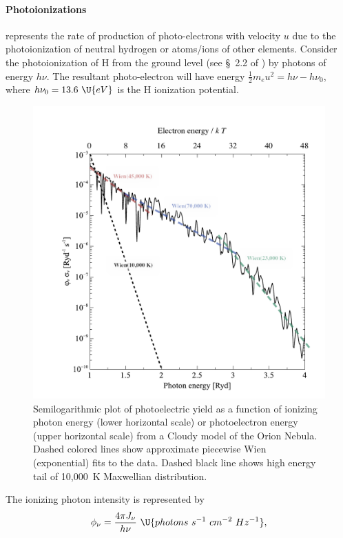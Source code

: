 \documentclass{emulateapj}
\begin{document}
\paragraph{Photoionizations}  represents the rate of
production of photo-electrons with velocity \(u\) due to the
photoionization of neutral hydrogen or atoms/ions of other elements.
Consider the photoionization of H from the ground level (see \S~2.2 of
\citealp{2006agna.book.....O}) by photons of energy \(h\nu\).
The resultant photo-electron will have energy \(\frac12 m_e u^2 = h\nu
- h\nu_0\), where \(h\nu_0 = 13.6~\U{eV}\) is the H ionization
potential.  
\begin{figure}[tp]
  \centering
  \includegraphics[width=0.9\linewidth]{edited-photoelectron-yield-orion}
  \caption{Semilogarithmic plot of photoelectric yield as a function
    of ionizing photon energy (lower horizontal scale) or
    photoelectron energy (upper horizontal scale) from a Cloudy model
    of the Orion Nebula.  Dashed colored lines show approximate
    piecewise Wien (exponential) fits to the data.  Dashed black line
    shows high energy tail of 10,000~K Maxwellian distribution.}
  \label{fig:photoelec}
\end{figure}%
The ionizing photon intensity is represented by 
\begin{equation}
  \label{eq:8}
  \phi_\nu = \frac{4\pi J_\nu}{h\nu} \ \U{photons\ s^{-1}\ cm^{-2} \ Hz^{-1}}, 
\end{equation}
\end{document}
